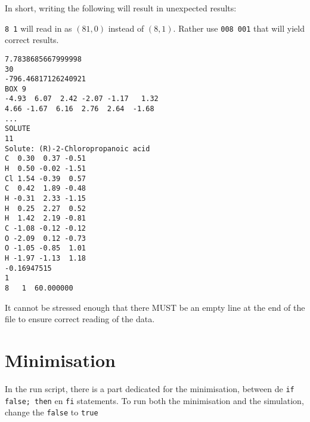 In short, writing the following will result in unexpected results:

\verb|8 1| will read in as $(81, 0)$ instead of $(8, 1)$. Rather use 
\verb|008 001| that will yield correct results.

\begin{lstlisting}[caption=Example of a correct box-file]
7.7838685667999998     
30
-796.46817126240921     
BOX 9
-4.93  6.07  2.42 -2.07 -1.17   1.32     
4.66 -1.67  6.16  2.76  2.64  -1.68     
...     
SOLUTE
11
Solute: (R)-2-Chloropropanoic acid
C  0.30  0.37 -0.51
H  0.50 -0.02 -1.51
Cl 1.54 -0.39  0.57
C  0.42  1.89 -0.48
H -0.31  2.33 -1.15
H  0.25  2.27  0.52
H  1.42  2.19 -0.81
C -1.08 -0.12 -0.12
O -2.09  0.12 -0.73
O -1.05 -0.85  1.01
H -1.97 -1.13  1.18
-0.16947515     
1
8   1  60.000000

\end{lstlisting}

It cannot be stressed enough that there MUST be an empty line at the end of the 
file to ensure correct reading of the data.

\section{Minimisation}
In the run script, there is a part dedicated for the minimisation, between de 
\verb|if false; then| en \verb|fi| statements. To run both the minimisation and 
the simulation, change the \verb|false| to \verb|true|